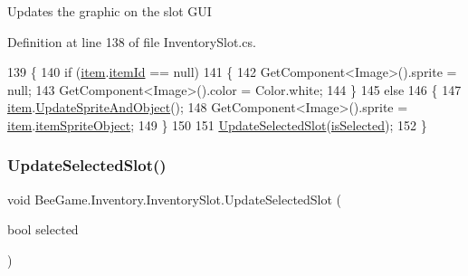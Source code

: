 Updates the graphic on the slot G\+UI 



Definition at line 138 of file Inventory\+Slot.\+cs.


\begin{DoxyCode}
139         \{
140             \textcolor{keywordflow}{if} (\hyperlink{class_bee_game_1_1_inventory_1_1_inventory_slot_a31b201e7eef9ed0001a447b3f76a7a81}{item}.\hyperlink{struct_bee_game_1_1_items_1_1_item_aa85bfeab893271c26f8ca41b638ada1c}{itemId} == null)
141             \{
142                 GetComponent<Image>().sprite = null;
143                 GetComponent<Image>().color = Color.white;
144             \}
145             \textcolor{keywordflow}{else}
146             \{
147                 \hyperlink{class_bee_game_1_1_inventory_1_1_inventory_slot_a31b201e7eef9ed0001a447b3f76a7a81}{item}.\hyperlink{struct_bee_game_1_1_items_1_1_item_a29abdb5010a23262e7562720bb85c171}{UpdateSpriteAndObject}();
148                 GetComponent<Image>().sprite = \hyperlink{class_bee_game_1_1_inventory_1_1_inventory_slot_a31b201e7eef9ed0001a447b3f76a7a81}{item}.\hyperlink{struct_bee_game_1_1_items_1_1_item_abd1dd5d605d0768bce6402f64f5cb699}{itemSpriteObject};
149             \}
150 
151             \hyperlink{class_bee_game_1_1_inventory_1_1_inventory_slot_adc03a9101c901f82a3dfc778db98cf1f}{UpdateSelectedSlot}(\hyperlink{class_bee_game_1_1_inventory_1_1_inventory_slot_a3c2a56594821f0567448a541b1236961}{isSelected});
152         \}
\end{DoxyCode}
\mbox{\label{class_bee_game_1_1_inventory_1_1_inventory_slot_adc03a9101c901f82a3dfc778db98cf1f}} 
\subsubsection{\texorpdfstring{Update\+Selected\+Slot()}{UpdateSelectedSlot()}}
{\footnotesize\ttfamily void Bee\+Game.\+Inventory.\+Inventory\+Slot.\+Update\+Selected\+Slot (\begin{DoxyParamCaption}\item[{bool}]{selected }\end{DoxyParamCaption})}



